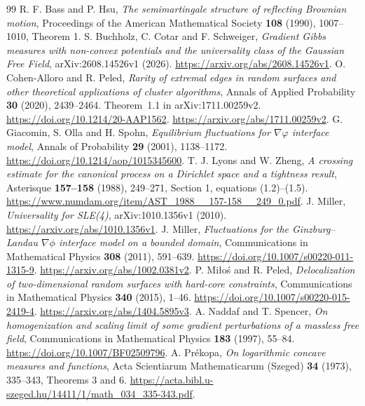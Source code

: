 \documentclass[11pt]{article}
\theoremstyle{definition}
\theoremstyle{remark}
\numberwithin{equation}{section}
\begin{document}
\begin{thebibliography}{99}
\setlength{\itemsep}{2pt plus 1pt minus 0.5pt}
 R. F. Bass and P. Hsu,
\emph{The semimartingale structure of reflecting Brownian motion},
Proceedings of the American Mathematical Society \textbf{108} (1990),
1007--1010, Theorem 1.
 S. Buchholz, C. Cotar and F. Schweiger,
\emph{Gradient Gibbs measures with non-convex potentials and the
universality class of the Gaussian Free Field},
arXiv:2608.14526v1 (2026).
\url{https://arxiv.org/abs/2608.14526v1}.
 O. Cohen-Alloro and R. Peled,
\emph{Rarity of extremal edges in random surfaces and other theoretical
 applications of cluster algorithms}, Annals of Applied Probability
\textbf{30} (2020), 2439--2464. Theorem~1.1 in arXiv:1711.00259v2.
\url{https://doi.org/10.1214/20-AAP1562}.
\url{https://arxiv.org/abs/1711.00259v2}.
 G. Giacomin, S. Olla and H. Spohn,
\emph{Equilibrium fluctuations for $\nabla\varphi$ interface model},
Annals of Probability \textbf{29} (2001), 1138--1172.
\url{https://doi.org/10.1214/aop/1015345600}.
 T. J. Lyons and W. Zheng,
\emph{A crossing estimate for the canonical process on a Dirichlet space
and a tightness result}, Asterisque \textbf{157--158} (1988), 249--271,
Section 1, equations (1.2)--(1.5).
\url{https://www.numdam.org/item/AST_1988__157-158__249_0.pdf}.
 J. Miller, \emph{Universality for SLE(4)},
arXiv:1010.1356v1 (2010). \url{https://arxiv.org/abs/1010.1356v1}.
 J. Miller,
\emph{Fluctuations for the Ginzburg--Landau $\nabla\phi$ interface model
on a bounded domain}, Communications in Mathematical Physics
\textbf{308} (2011), 591--639.
\url{https://doi.org/10.1007/s00220-011-1315-9}.
\url{https://arxiv.org/abs/1002.0381v2}.
 P. Mi\l o\'s and R. Peled,
\emph{Delocalization of two-dimensional random surfaces with hard-core
constraints}, Communications in Mathematical Physics
\textbf{340} (2015), 1--46.
\url{https://doi.org/10.1007/s00220-015-2419-4}.
\url{https://arxiv.org/abs/1404.5895v3}.
 A. Naddaf and T. Spencer,
\emph{On homogenization and scaling limit of some gradient perturbations
of a massless free field}, Communications in Mathematical Physics
\textbf{183} (1997), 55--84.
\url{https://doi.org/10.1007/BF02509796}.
 A. Pr\'ekopa,
\emph{On logarithmic concave measures and functions},
Acta Scientiarum Mathematicarum (Szeged) \textbf{34} (1973), 335--343,
Theorems 3 and 6.
\url{https://acta.bibl.u-szeged.hu/14411/1/math_034_335-343.pdf}.

\end{thebibliography}
\end{document}
